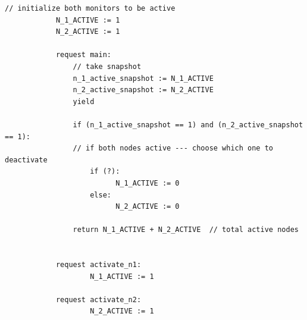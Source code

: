 \begin{minipage}[t]{1.0\textwidth}
	\begin{lstlisting}[caption={Snapshot-based monitor deactivation (not serializable, as it can return a sum of 0 active monitors)}]
			// initialize both monitors to be active
			N_1_ACTIVE := 1
			N_2_ACTIVE := 1
			
			request main:
				// take snapshot
				n_1_active_snapshot := N_1_ACTIVE
				n_2_active_snapshot := N_2_ACTIVE
				yield
				
				if (n_1_active_snapshot == 1) and (n_2_active_snapshot == 1):
				// if both nodes active --- choose which one to deactivate 
					if (?): 
						  N_1_ACTIVE := 0
					else:
						  N_2_ACTIVE := 0
					
				return N_1_ACTIVE + N_2_ACTIVE  // total active nodes
				
			
			request activate_n1:
				    N_1_ACTIVE := 1
			
			request activate_n2:
				    N_2_ACTIVE := 1
			
			
		\end{lstlisting}
\end{minipage}




%
%
%
%




